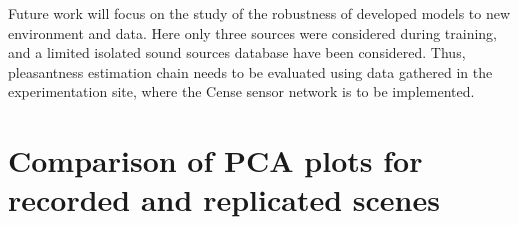 \documentclass[11pt,a4paper]{article}
\begin{document}
Future work will focus on the study of the robustness of developed models to new environment and data. Here only three sources were considered during training, and a limited isolated sound sources database have been considered. Thus, pleasantness estimation chain needs to be evaluated using data gathered in the experimentation site, where the Cense sensor network is to be implemented.


\clearpage









\clearpage
\appendix
\section{Comparison of PCA plots for recorded and replicated scenes}
\label{sec:app_a}
\end{document}
